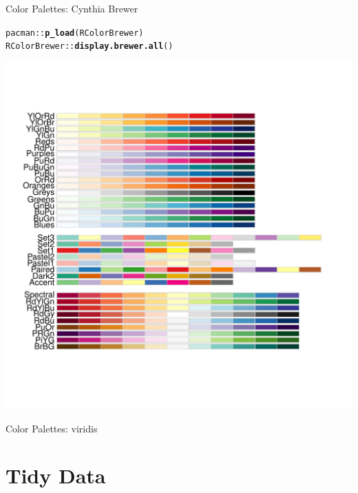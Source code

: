 \documentclass[10pt,handout]{beamer}\usepackage[]{graphicx}\usepackage[]{color}
\makeatletter
\def\maxwidth{ %
  \ifdim\Gin@nat@width>\linewidth
    \linewidth
  \else
    \Gin@nat@width
  \fi
}
\newcommand{\hlopt}[1]{\textcolor[rgb]{0,0,0}{#1}}%
\newcommand{\hlstd}[1]{\textcolor[rgb]{0.345,0.345,0.345}{#1}}%
\newcommand{\hlkwd}[1]{\textcolor[rgb]{0.737,0.353,0.396}{\textbf{#1}}}%
\newenvironment{kframe}{%
 \def\at@end@of@kframe{}%
 \ifinner\ifhmode%
  \def\at@end@of@kframe{\end{minipage}}%
  \begin{minipage}{\columnwidth}%
 \fi\fi%
 \def\FrameCommand##1{\hskip\@totalleftmargin \hskip-\fboxsep
 \colorbox{shadecolor}{##1}\hskip-\fboxsep
     \hskip-\linewidth \hskip-\@totalleftmargin \hskip\columnwidth}%
 \MakeFramed {\advance\hsize-\width
   \@totalleftmargin\z@ \linewidth\hsize
   \@setminipage}}%
 {\par\unskip\endMakeFramed%
 \at@end@of@kframe}
\newenvironment{knitrout}{}{} %
\makeatother
\begin{document}
\begin{frame}[fragile]{Color Palettes: Cynthia Brewer}
	
\begin{knitrout}\tiny
{}\color{fgcolor}\begin{kframe}
\begin{alltt}
\hlstd{pacman}\hlopt{::}\hlkwd{p_load}\hlstd{(RColorBrewer)}
\hlstd{RColorBrewer}\hlopt{::}\hlkwd{display.brewer.all}\hlstd{()}
\end{alltt}
\end{kframe}

{\centering \includegraphics[width=\maxwidth]{figure/unnamed-chunk-5-1} 

}


\end{knitrout}
	
	
\end{frame}



\begin{frame}[fragile]{Color Palettes: viridis}
	
	
	
	
	
\end{frame}

\section{Tidy Data}
\end{document}
